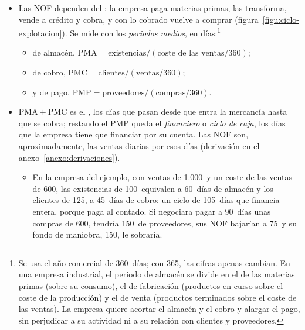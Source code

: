 \documentclass[11pt]{article}
\begin{document}
\begin{itemize}
\begin{itemize}
  \item En la empresa del ejemplo, sin proveedores, las NOF son las existencias más los clientes, $100+125=225$, más que su fondo de maniobra, 150: los 75~de diferencia se financian con la deuda bancaria a corto, 150, menos la tesorería, 75.
  \end{itemize}
\item Las NOF dependen del : la empresa paga materias primas, las transforma, vende a crédito y cobra, y con lo cobrado vuelve a comprar (figura~\ref{figu:ciclo-explotacion}). Se mide con los \emph{periodos medios}, en días:\footnote{Se usa el año comercial de 360~días; con 365, las cifras apenas cambian. En una empresa industrial, el periodo de almacén se divide en el de las materias primas (sobre su consumo), el de fabricación (productos en curso sobre el coste de la producción) y el de venta (productos terminados sobre el coste de las ventas). La empresa quiere acortar el almacén y el cobro y alargar el pago, sin perjudicar a su actividad ni a su relación con clientes y proveedores.}
  \begin{itemize}
  \item de almacén, $\mathrm{PMA}=\text{existencias}/(\text{coste de las ventas}/360)$;
  \item de cobro, $\mathrm{PMC}=\text{clientes}/(\text{ventas}/360)$;
  \item y de pago, $\mathrm{PMP}=\text{proveedores}/(\text{compras}/360)$.
  \end{itemize}
\item $\mathrm{PMA}+\mathrm{PMC}$ es el , los días que pasan desde que entra la mercancía hasta que se cobra; restando el PMP queda el \emph{financiero} o \emph{ciclo de caja}, los días que la empresa tiene que financiar por su cuenta. Las NOF son, aproximadamente, las ventas diarias por esos días (derivación en el anexo~\ref{anexo:derivaciones}).
  \begin{itemize}
  \item En la empresa del ejemplo, con ventas de 1.000~y un coste de las ventas de 600, las existencias de 100~equivalen a 60~días de almacén y los clientes de 125, a 45~días de cobro: un ciclo de 105~días que financia entera, porque paga al contado. Si negociara pagar a 90~días unas compras de 600, tendría 150~de proveedores, sus NOF bajarían a 75~y su fondo de maniobra, 150, le sobraría.
  \end{itemize}
\end{itemize}
\end{document}
